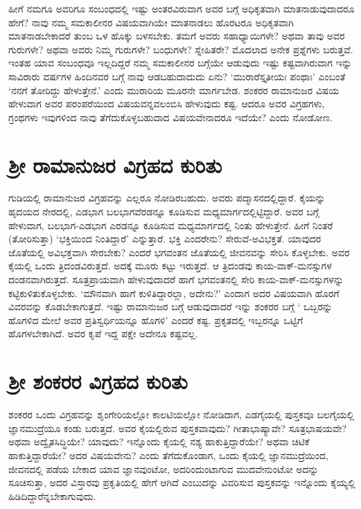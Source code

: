 ಹೀಗೆ ನಮಗೂ ಅವರಿಗೂ ಸಂಬಂಧದಲ್ಲಿ ಇಷ್ಟು ಅಂತರವಿರುವಾಗ ಅವರ ಬಗ್ಗೆ ಅಧಿಕೃತವಾಗಿ ಮಾತನಾಡುವುದಾದರೂ ಹೇಗೆ? ನಾವು ನಮ್ಮ ಸಮಕಾಲೀನರ ವಿಷಯವಾಗಿಯೇ ಮಾತನಾಡಲು ಹೊರಟರೂ ಅಧಿಕೃತವಾಗಿ ಮಾತನಾಡಬೇಕಾದರೆ ತುಂಬ ಒಳ ಹೊಕ್ಕು ಬಳಸಬೇಕು. ತಮಗೆ ಅವರು ಸಹಾಧ್ಯಾಯಿಗಳೇ? ಅಥವಾ ತಾವು ಅವರ ಗುರುಗಳೇ? ಅಥವಾ ಅವರು ನಿಮ್ಮ ಗುರುಗಳೇ? ಬಂಧುಗಳೇ? ಸ್ನೇಹಿತರೇ? ಮೊದಲಾದ ಅನೇಕ  ಪ್ರಶ್ನೆಗಳು ಬರುತ್ತವೆ. ಇಂತಹ ಯಾವ ಸಂಬಂಧವೂ ಇಲ್ಲದಿದ್ದರೆ ನಮ್ಮ ಸಮಕಾಲೀನರ ಬಗ್ಗೆಯೇ ಆಡುವುದು ಇಷ್ಟು  ಕಷ್ಟವಾಗಿರುವಾಗ ಇನ್ನು ಸಾವಿರಾರು ವರ್ಷಗಳ ಹಿಂದಿನವರ ಬಗ್ಗೆ ನಾವು ಆಡಬಹುದಾದುದು ಏನು? `ಮುರಾರೆಸ್ತೃತೀಯಃ ಪಂಥಾಃ' ಎಂಬಂತೆ `ನನಗೆ ತೋರಿದ್ದು ಹೇಳುತ್ತೇನೆ.' ಎಂದು ಮುರಾರಿಯ ಮೂರನೇ ಮಾರ್ಗಬೇಡ. ಶಂಕರರ ರಾಮಾನುಜರ ವಿಷಯ ಹೇಳುವಾಗ ಅವರ ಪರಂಪರೆಯಿಂದ ವಿಷಯವನ್ನವಲಂಬಿಸಿ ಹೇಳುವುದು ಕಷ್ಟ. ಆದರೂ ಅವರ ವಿಗ್ರಹಗಳು, ಗ್ರಂಥಗಳು ಇವುಗಳಿಂದ ನಾವು ತೆಗೆದುಕೊಳ್ಳಬಹುದಾದ ವಿಷಯವೇನಾದರೂ ಇದೆಯೇ? ಎಂದು ನೋಡೋಣ.

\section*{ಶ್ರೀ ರಾಮಾನುಜರ ವಿಗ್ರಹದ ಕುರಿತು}

ಗುಡಿಯಲ್ಲಿ ರಾಮಾನುಜರ ವಿಗ್ರಹವನ್ನು ಎಲ್ಲರೂ ನೋಡಿರಬಹುದು. ಅವರು ಪದ್ಮಾಸನದಲ್ಲಿದ್ದಾರೆ. ಕೈಯನ್ನು ಹೃದಯದ ನೇರದಲ್ಲಿ, ಎಡಭಾಗ ಬಲಭಾಗವೆರಡನ್ನೂ ಕೂಡಿಸುವ ಮಧ್ಯಮಾರ್ಗದಲ್ಲಿಟ್ಟಿದ್ದಾರೆ. ಅವರ ಬಗ್ಗೆ ಹೇಳುವಾಗ, ಬಲಭಾಗ-ಎಡಭಾಗ ಎರಡನ್ನೂ ಕೂಡಿಸುವ ಮಧ್ಯಮಾರ್ಗದಲ್ಲಿ ನಿಂತು ಹೇಳುತ್ತೇನೆ. ಹೀಗೆ ನಿಂತರೆ (ತೋರಿಸುತ್ತಾ) `ಭಕ್ತಿಯಿಂದ ನಿಂತಿದ್ದಾರೆ' ಎನ್ನುತ್ತಾರೆ. ಭಕ್ತಿ ಎಂದರೇನು? ಸೇರುವೆ-ಅವಿಭಕ್ತತೆ. ಯಾವುದರ ಜೊತೆಯಲ್ಲಿ ಅವಿಭಕ್ತವಾಗಿ ಸೇರಬೇಕು? ಎಂದರೆ ಭಗವಂತನ ಜೊತೆಯಲ್ಲಿ ಜೀವನವನ್ನು ಸೇರಿಸಿ ಕೊಳ್ಳಬೇಕು. ಅವರ ಕೈಯಲ್ಲಿ ಒಂದು ತ್ರಿದಂಡವಿರುತ್ತದೆ. ಅದಕ್ಕೆ ಮೂರು ಕಟ್ಟು ಇರುತ್ತದೆ. ಆ ತ್ರಿದಂಡವು ಕಾಯ-ವಾಕ್-ಮನಸ್ಸುಗಳ ದಂಡನವಾಗಿರುತ್ತದೆ. ಸೂತ್ರಪ್ರಾಯವಾಗಿ ಹೇಳುವುದಾದರೆ ಹಾಗೆ ಭಗವಂತನಲ್ಲಿ ಸೇರಿ ಕಾಯ-ವಾಕ್-ಮನಸ್ಸುಗಳನ್ನು ಕಟ್ಟಿಕುಳಿತುಕೊಳ್ಳಬೇಕು. `ಮೌನವಾಗಿ ಹಾಗೆ ಕುಳಿತಿದ್ದಾರಲ್ಲಾ, ಅದೇನು?' ಎಂದಾಗ ಅದರ ವಿಷಯವಾಗಿ ಹೊರಗೆ ವಿವರವನ್ನು ಕೊಡಬೇಕಾಗುತ್ತದೆ. ಇಷ್ಟು ರಾಮಾನುಜರ ಬಗ್ಗೆ ಆಡುವುದಾದರೆ ಇನ್ನು ಶಂಕರರ ಬಗ್ಗೆ ` ಒಬ್ಬರನ್ನು ಹೊಗಳಿದ ಮೇಲೆ ಅವರ ಪ್ರತಿಸ್ವರ್ಧಿಯನ್ನೂ ಹೊಗಳಿ' ಎಂದರೆ ಕಷ್ಟ. ಪ್ರಕೃತದಲ್ಲಿ ಇಬ್ಬರನ್ನೂ ಒಟ್ಟಿಗೆ ಹೊಗಳಬೇಕಾಗಿದೆ. ಅವರ ಕೃಪೆ ಇದ್ದ ಪಕ್ಷೇ ಅದೇನೂ ಕಷ್ಟವಲ್ಲ.

\section*{ಶ್ರೀ ಶಂಕರರ ವಿಗ್ರಹದ ಕುರಿತು}

ಶಂಕರರ ಒಂದು ವಿಗ್ರಹವನ್ನು ಶೃಂಗೇರಿಯಲ್ಲೋ ಕಾಲಟಿಯಲ್ಲೋ ನೋಡಿದಾಗ, ಎಡಗೈಯಲ್ಲಿ ಪುಸ್ತಕವೂ ಬಲಗೈಯಲ್ಲಿ ಜ್ಞಾನಮುದ್ರೆಯೂ ಕಂಡು ಬರುತ್ತದೆ. ಅವರ ಕೈಯಲ್ಲಿರುವ ಪುಸ್ತಕವಾವುದು? ಗೀತಾಭಾಷ್ಯಾವೇ? ಸೂತ್ರಭಾಷಯವೇ? ಅಥವಾ ಅದ್ವೈತಸಿದ್ಧಿಯೇ? ಯಾವುದು? ಇನ್ನೊಂದು ಕೈಯಲ್ಲಿ ನಶ್ಯ ಹಾಕುತ್ತಿದ್ದಾರೆಯೇ? ಅಥವಾ ಚಿಟಿಕೆ ಹಾಕುತ್ತಿದ್ದಾರೆಯೇ? ಅದರ ವಿಷಯವೇನು? ಎಂದು ತೆಗೆದುಕೊಂಡಾಗ, ಒಂದು ಕೈಯಲ್ಲಿ  ಜ್ಞಾನಮುದ್ರೆಯಿಂದ, ಜೀವನದಲ್ಲಿ ಪಡೆಯ ಬೇಕಾದ ಯಾವ ಜ್ಞಾನವುಂಟೋ, ಅದರಿಂದುಂಟಾಗುವ ಮುದವೇನುಂಟೋ ಅದನ್ನು ಸೂಚಿಸುತ್ತಾ, ಅದರ ವಿಸ್ತಾರವು ಪ್ರಕೃತಿಯಲ್ಲಿ ಹೇಗೆ ಆಗಿದೆ ಎಂಬುದನ್ನು ವಿವರಿಸುವ ಪುಸ್ತಕವನ್ನು  ಇನ್ನೊಂದು ಕೈಯ್ಯಲ್ಲಿ ಹಿಡಿದಿದ್ದಾರೆನ್ನಬೇಕಾಗುವುದು.

